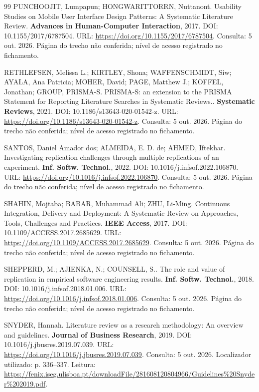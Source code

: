 \begin{thebibliography}{99}
 PUNCHOOJIT, Lumpapun; HONGWARITTORRN, Nuttanont. Usability Studies on Mobile User Interface Design Patterns: A Systematic Literature Review. \textbf{Advances in Human-Computer Interaction}, 2017. DOI: 10.1155/2017/6787504. URL: \url{https://doi.org/10.1155/2017/6787504}. Consulta: 5 out. 2026. Página do trecho não conferida; nível de acesso registrado no fichamento.

 RETHLEFSEN, Melissa L.; KIRTLEY, Shona; WAFFENSCHMIDT, Siw; AYALA, Ana Patricia; MOHER, David; PAGE, Matthew J.; KOFFEL, Jonathan; GROUP, PRISMA-S. PRISMA-S: an extension to the PRISMA Statement for Reporting Literature Searches in Systematic Reviews.. \textbf{Systematic Reviews}, 2021. DOI: 10.1186/s13643-020-01542-z. URL: \url{https://doi.org/10.1186/s13643-020-01542-z}. Consulta: 5 out. 2026. Página do trecho não conferida; nível de acesso registrado no fichamento.

 SANTOS, Daniel Amador dos; ALMEIDA, E. D. de; AHMED, Iftekhar. Investigating replication challenges through multiple replications of an experiment. \textbf{Inf. Softw. Technol.}, 2022. DOI: 10.1016/j.infsof.2022.106870. URL: \url{https://doi.org/10.1016/j.infsof.2022.106870}. Consulta: 5 out. 2026. Página do trecho não conferida; nível de acesso registrado no fichamento.

 SHAHIN, Mojtaba; BABAR, Muhammad Ali; ZHU, Li-Ming. Continuous Integration, Delivery and Deployment: A Systematic Review on Approaches, Tools, Challenges and Practices. \textbf{IEEE Access}, 2017. DOI: 10.1109/ACCESS.2017.2685629. URL: \url{https://doi.org/10.1109/ACCESS.2017.2685629}. Consulta: 5 out. 2026. Página do trecho não conferida; nível de acesso registrado no fichamento.

 SHEPPERD, M.; AJIENKA, N.; COUNSELL, S.. The role and value of replication in empirical software engineering results. \textbf{Inf. Softw. Technol.}, 2018. DOI: 10.1016/j.infsof.2018.01.006. URL: \url{https://doi.org/10.1016/j.infsof.2018.01.006}. Consulta: 5 out. 2026. Página do trecho não conferida; nível de acesso registrado no fichamento.

 SNYDER, Hannah. Literature review as a research methodology: An overview and guidelines. \textbf{Journal of Business Research}, 2019. DOI: 10.1016/j.jbusres.2019.07.039. URL: \url{https://doi.org/10.1016/j.jbusres.2019.07.039}. Consulta: 5 out. 2026. Localizador utilizado: p. 336–337. Leitura: \url{https://fenix.iseg.ulisboa.pt/downloadFile/281608120804966/Guidelines%20Snyder%202019.pdf}.


\end{thebibliography}
